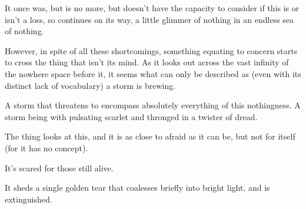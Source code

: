 It once was, but is no more, but doesn’t have the capacity to consider if this is or isn’t a loss, so continues on its way, a little glimmer of nothing in an endless sea of nothing.\medskip

However, in spite of all these shortcomings, something equating to concern starts to cross the thing that isn’t its mind. As it looks out across the vast infinity of the nowhere space before it, it seems what can only be described as (even with its distinct lack of vocabulary) a storm is brewing.\medskip

A storm that threatens to encompass absolutely everything of this nothingness. A storm being with pulsating scarlet and thronged in a twister of dread.\medskip

The thing looks at this, and it is as close to afraid as it can be, but not for itself (for it has no concept).\medskip

It’s scared for those still alive.\medskip

It sheds a single golden tear that coalesses briefly into bright light, and is extinguished.\medskip

\vspace*{5mm}
